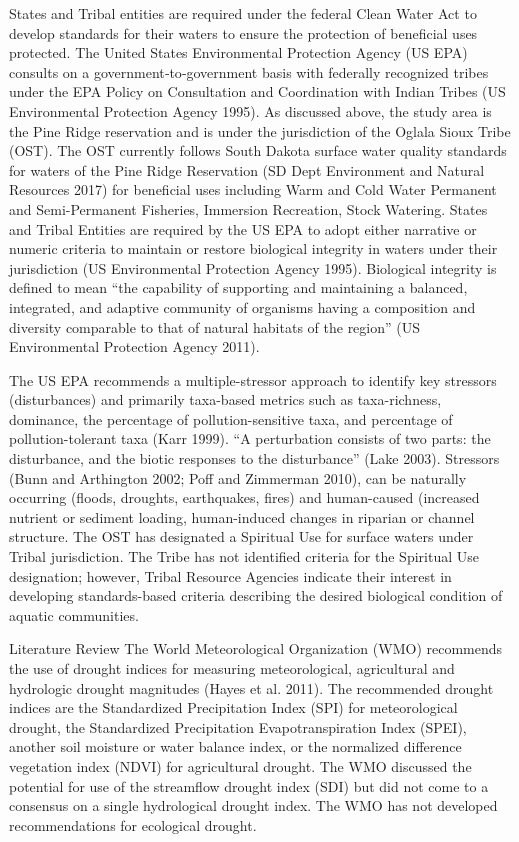 \documentclass[12pt,twoside]{reedthesis}
\theoremstyle{definition}
\theoremstyle{definition}
\theoremstyle{definition}
\theoremstyle{remark}
\begin{document}
States and Tribal entities are required under the federal Clean Water
Act to develop standards for their waters to ensure the protection of
beneficial uses protected. The United States Environmental Protection
Agency (US EPA) consults on a government‐to‐government basis with
federally recognized tribes under the EPA Policy on Consultation and
Coordination with Indian Tribes (US Environmental Protection Agency
1995). As discussed above, the study area is the Pine Ridge reservation
and is under the jurisdiction of the Oglala Sioux Tribe (OST). The OST
currently follows South Dakota surface water quality standards for
waters of the Pine Ridge Reservation (SD Dept Environment and Natural
Resources 2017) for beneficial uses including Warm and Cold Water
Permanent and Semi-Permanent Fisheries, Immersion Recreation, Stock
Watering. States and Tribal Entities are required by the US EPA to adopt
either narrative or numeric criteria to maintain or restore biological
integrity in waters under their jurisdiction (US Environmental
Protection Agency 1995). Biological integrity is defined to mean ``the
capability of supporting and maintaining a balanced, integrated, and
adaptive community of organisms having a composition and diversity
comparable to that of natural habitats of the region'' (US Environmental
Protection Agency 2011).

The US EPA recommends a multiple-stressor approach to identify key
stressors (disturbances) and primarily taxa-based metrics such as
taxa-richness, dominance, the percentage of pollution-sensitive taxa,
and percentage of pollution-tolerant taxa (Karr 1999). ``A perturbation
consists of two parts: the disturbance, and the biotic responses to the
disturbance'' (Lake 2003). Stressors (Bunn and Arthington 2002; Poff and
Zimmerman 2010), can be naturally occurring (floods, droughts,
earthquakes, fires) and human-caused (increased nutrient or sediment
loading, human-induced changes in riparian or channel structure. The OST
has designated a Spiritual Use for surface waters under Tribal
jurisdiction. The Tribe has not identified criteria for the Spiritual
Use designation; however, Tribal Resource Agencies indicate their
interest in developing standards-based criteria describing the desired
biological condition of aquatic communities.

Literature Review The World Meteorological Organization (WMO) recommends
the use of drought indices for measuring meteorological, agricultural
and hydrologic drought magnitudes (Hayes et al. 2011). The recommended
drought indices are the Standardized Precipitation Index (SPI) for
meteorological drought, the Standardized Precipitation
Evapotranspiration Index (SPEI), another soil moisture or water balance
index, or the normalized difference vegetation index (NDVI) for
agricultural drought. The WMO discussed the potential for use of the
streamflow drought index (SDI) but did not come to a consensus on a
single hydrological drought index. The WMO has not developed
recommendations for ecological drought.
\end{document}
